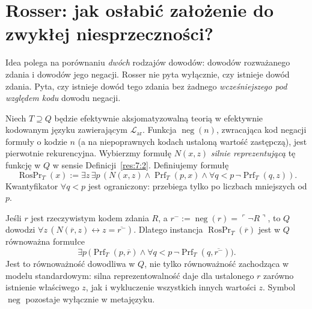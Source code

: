 \section{Rosser: jak osłabić założenie do zwykłej niesprzeczności?}
Idea polega na porównaniu \emph{dwóch} rodzajów dowodów:
dowodów rozważanego zdania i dowodów jego negacji.
Rosser nie pyta wyłącznie, czy istnieje dowód zdania.
Pyta, czy istnieje dowód tego zdania bez żadnego
\emph{wcześniejszego pod względem kodu} dowodu negacji.

\begin{definicja}\label{def:rosser-predicate}
Niech $T\supseteq Q$ będzie efektywnie aksjomatyzowalną
teorią w efektywnie kodowanym języku zawierającym
$\mathcal L_{\mathrm{ar}}$.
Funkcja $\operatorname{neg}(n)$, zwracająca kod negacji
formuły o kodzie $n$ (a na niepoprawnych kodach ustaloną
wartość zastępczą), jest pierwotnie rekurencyjna.
Wybierzmy formułę $N(x,z)$ \emph{silnie reprezentującą}
tę funkcję w $Q$ w sensie Definicji~\ref{res:7:2}.
Definiujemy formułę
\[
\operatorname{RosPr}_T(x):=
\exists z\,\exists p\,
\left(N(x,z)\land\operatorname{Prf}_T(p,x)
\land\forall q<p\,\neg\operatorname{Prf}_T(q,z)\right).
\]
Kwantyfikator $\forall q<p$ jest ograniczony:
przebiega tylko po liczbach mniejszych od $p$.
\end{definicja}

\begin{uwaga}
Jeśli $r$ jest rzeczywistym kodem zdania $R$,
a $r^-:=\operatorname{neg}(r)=\ulcorner\neg R\urcorner$,
to $Q$ dowodzi
$\forall z\,(N(\overline r,z)\leftrightarrow z=\overline{r^-})$.
Dlatego instancja $\operatorname{RosPr}_T(\overline r)$
jest w $Q$ równoważna formułce
\[
\exists p\,\bigl(\operatorname{Prf}_T(p,\overline r)
\land\forall q<p\,\neg\operatorname{Prf}_T(q,\overline{r^-})\bigr).
\]
Jest to równoważność dowodliwa w $Q$, nie tylko
równoważność zachodząca w modelu standardowym:
silna reprezentowalność daje dla ustalonego $r$
zarówno istnienie właściwego $z$, jak i wykluczenie
wszystkich innych wartości $z$. Symbol
$\operatorname{neg}$ pozostaje wyłącznie w metajęzyku.
\end{uwaga}

